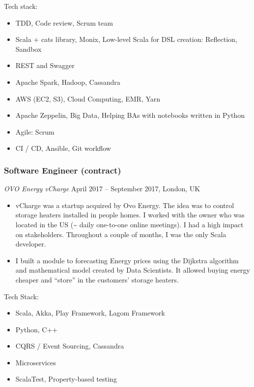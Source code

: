 \documentclass[]{rss}
\providecommand{\tightlist}{%
  \setlength{\itemsep}{0pt}\setlength{\parskip}{0pt}}
\begin{document}
\begin{resume}
Tech stack:

\begin{itemize}
\tightlist
\item
  TDD, Code review, Scrum team
\item
  Scala + cats library, Monix, Low-level Scala for DSL creation:
  Reflection, Sandbox
\item
  REST and Swagger
\item
  Apache Spark, Hadoop, Cassandra
\item
  AWS (EC2, S3), Cloud Computing, EMR, Yarn
\item
  Apache Zeppelin, Big Data, Helping BAs with notebooks written in
  Python
\item
  Agile: Scrum
\item
  CI / CD, Ansible, Git workflow
\end{itemize}

\subsubsection{Software Engineer
(contract)}\label{software-engineer-contract}

\emph{OVO Energy \textbar{} vCharge} April 2017 -- September 2017,
London, UK

\begin{itemize}
\item
  vCharge was a startup acquired by Ovo Energy. The idea was to control
  storage heaters installed in people homes. I worked with the owner who
  was located in the US (\textasciitilde{} daily one-to-one online
  meetings). I had a high impact on stakeholders. Throughout a couple of
  months, I was the only Scala developer.
\item
  I built a module to forecasting Energy prices using the Dijkstra
  algorithm and mathematical model created by Data Scientists. It
  allowed buying energy cheaper and ``store'' in the customers' storage
  heaters.
\end{itemize}

Tech Stack:

\begin{itemize}
\tightlist
\item
  Scala, Akka, Play Framework, Lagom Framework
\item
  Python, C++
\item
  CQRS / Event Sourcing, Cassandra
\item
  Microservices
\item
  ScalaTest, Property-based testing
\end{itemize}


\end{resume}
\end{document}
